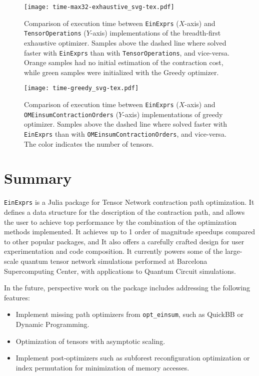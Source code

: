 \documentclass{juliacon}
\begin{document}
\begin{figure}
    \centering
    \texttt{[image: time-max32-exhaustive\_svg-tex.pdf]}
    \caption{Comparison of execution time between \texttt{EinExprs} ($X$-axis) and \texttt{TensorOperations} ($Y$-axis) implementations of the breadth-first exhaustive optimizer. Samples above the dashed line where solved faster with \texttt{EinExprs} than with \texttt{TensorOperations}, and vice-versa. Orange samples had no initial estimation of the contraction cost, while green samples were initialized with the Greedy optimizer.}
    \label{fig:exhaustive:time}
\end{figure}

\begin{figure}
    \centering
    \texttt{[image: time-greedy\_svg-tex.pdf]}
    \caption{Comparison of execution time between \texttt{EinExprs} ($X$-axis) and \texttt{OMEinsumContractionOrders} ($Y$-axis) implementations of greedy optimizer. Samples above the dashed line where solved faster with \texttt{EinExprs} than with \texttt{OMEinsumContractionOrders}, and vice-versa. The color indicates the number of tensors.}
    \label{fig:greedy:time}
\end{figure}

\section{Summary}

\texttt{EinExprs} is a Julia package for Tensor Network contraction path optimization. It defines a data structure for the description of the contraction path, and allows the user to achieve top performance by the combination of the optimization methods implemented. It achieves up to 1 order of magnitude speedups compared to other popular packages, and It also offers a carefully crafted design for user experimentation and code composition. It currently powers some of the large-scale quantum tensor network simulations performed at Barcelona Supercomputing Center, with applications to Quantum Circuit simulations.

In the future, perspective work on the package includes addressing the following features:
\begin{itemize}
    \item Implement missing path optimizers from \texttt{opt\_einsum}, such as QuickBB or Dynamic Programming.
    \item Optimization of tensors with asymptotic scaling.
    \item Implement post-optimizers such as subforest reconfiguration optimization or index permutation for minimization of memory accesses.
\end{itemize}
\end{document}
